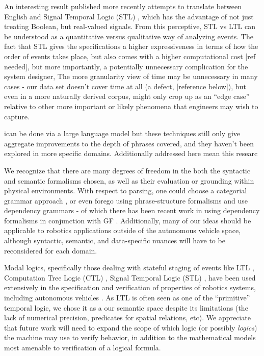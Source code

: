 \documentclass[a4paper, 11pt]{article}
\begin{document}
An interesting result published more recently attempts to translate between
English and Signal Temporal Logic (STL) \cite{he2021english}, which has the
advantage of not just treating Boolean, but real-valued signals. From this
perceptive, STL vs LTL can be understood as a quantitative versus qualitative
way of analyzing events. The fact that STL gives the specifications a higher
expressiveness in terms of how the order of events takes place, but also comes
with a higher computational cost [ref needed], but more importantly, a
potentially unnecessary complication for the system designer, The more
granularity view of time may be unnecessary in many cases - our data set doesn't
cover time at all (a defect, [reference below]), but even in a more naturally
derived corpus, might only crop up as an ``edge case'' relative to other more
important or likely phenomena that engineers may wish to capture.



ican be done via a large language model 
 but these techniques still only give
aggregate improvements to the depth of phrases covered, and they haven't been
explored in more specific domains. Additionally
addressed here mean this researc

We recognize that there are many degrees of freedom in the both the syntactic
and semantic formalisms chosen, as well as their evaluation or grounding within
physical environments. With respect to parsing, one could choose a categorial
grammar approach \cite{5152776}, or even forego using phrase-structure
formalisms and use dependency grammars - of which there has been recent work in
using dependency formalisms in conjunction with GF \cite{ranta2017cross}.
Additionally, many of our ideas should be applicable to robotics applications
outside of the autonomous vehicle space, although syntactic, semantic, and
data-specific nuances will have to be reconsidered for each domain.



Modal logics, specifically those dealing with stateful staging of events like
LTL \cite{ltl95}, Computation Tree Logic (CTL) \cite{yooCTL}, Signal Temporal
Logic (STL) \cite{stlAut} , have been used extensively in the specification and
verification of properties of robotics systems, including autonomous vehicles .
As LTL is often seen as one of the ``primitive'' temporal logic, we chose it as
a our semantic space despite its limitations (the lack of numerical precision,
predicates for spatial relations, etc). We appreciate that future work will need
to expand the scope of which logic (or possibly \emph{logics}) the machine may
use to verify behavior, in addition to the mathematical models most amenable to
verification of a logical formula.
\end{document}
